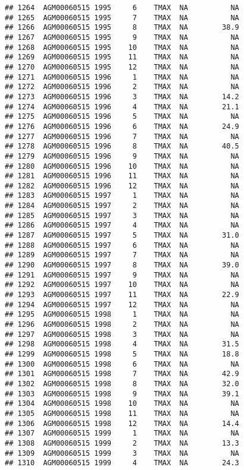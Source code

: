 \documentclass{article}\usepackage[]{graphicx}\usepackage[]{color}
\makeatletter
\newenvironment{kframe}{%
 \def\at@end@of@kframe{}%
 \ifinner\ifhmode%
  \def\at@end@of@kframe{\end{minipage}}%
  \begin{minipage}{\columnwidth}%
 \fi\fi%
 \def\FrameCommand##1{\hskip\@totalleftmargin \hskip-\fboxsep
 \colorbox{shadecolor}{##1}\hskip-\fboxsep
     \hskip-\linewidth \hskip-\@totalleftmargin \hskip\columnwidth}%
 \MakeFramed {\advance\hsize-\width
   \@totalleftmargin\z@ \linewidth\hsize
   \@setminipage}}%
 {\par\unskip\endMakeFramed%
 \at@end@of@kframe}
\newenvironment{knitrout}{}{} %
\makeatother
\begin{document}
\begin{knitrout}
\begin{kframe}
\begin{verbatim}
## 1264  AGM00060515 1995     6    TMAX  NA          NA
## 1265  AGM00060515 1995     7    TMAX  NA          NA
## 1266  AGM00060515 1995     8    TMAX  NA        38.9
## 1267  AGM00060515 1995     9    TMAX  NA          NA
## 1268  AGM00060515 1995    10    TMAX  NA          NA
## 1269  AGM00060515 1995    11    TMAX  NA          NA
## 1270  AGM00060515 1995    12    TMAX  NA          NA
## 1271  AGM00060515 1996     1    TMAX  NA          NA
## 1272  AGM00060515 1996     2    TMAX  NA          NA
## 1273  AGM00060515 1996     3    TMAX  NA        14.2
## 1274  AGM00060515 1996     4    TMAX  NA        21.1
## 1275  AGM00060515 1996     5    TMAX  NA          NA
## 1276  AGM00060515 1996     6    TMAX  NA        24.9
## 1277  AGM00060515 1996     7    TMAX  NA          NA
## 1278  AGM00060515 1996     8    TMAX  NA        40.5
## 1279  AGM00060515 1996     9    TMAX  NA          NA
## 1280  AGM00060515 1996    10    TMAX  NA          NA
## 1281  AGM00060515 1996    11    TMAX  NA          NA
## 1282  AGM00060515 1996    12    TMAX  NA          NA
## 1283  AGM00060515 1997     1    TMAX  NA          NA
## 1284  AGM00060515 1997     2    TMAX  NA          NA
## 1285  AGM00060515 1997     3    TMAX  NA          NA
## 1286  AGM00060515 1997     4    TMAX  NA          NA
## 1287  AGM00060515 1997     5    TMAX  NA        31.0
## 1288  AGM00060515 1997     6    TMAX  NA          NA
## 1289  AGM00060515 1997     7    TMAX  NA          NA
## 1290  AGM00060515 1997     8    TMAX  NA        39.0
## 1291  AGM00060515 1997     9    TMAX  NA          NA
## 1292  AGM00060515 1997    10    TMAX  NA          NA
## 1293  AGM00060515 1997    11    TMAX  NA        22.9
## 1294  AGM00060515 1997    12    TMAX  NA          NA
## 1295  AGM00060515 1998     1    TMAX  NA          NA
## 1296  AGM00060515 1998     2    TMAX  NA          NA
## 1297  AGM00060515 1998     3    TMAX  NA          NA
## 1298  AGM00060515 1998     4    TMAX  NA        31.5
## 1299  AGM00060515 1998     5    TMAX  NA        18.8
## 1300  AGM00060515 1998     6    TMAX  NA          NA
## 1301  AGM00060515 1998     7    TMAX  NA        42.9
## 1302  AGM00060515 1998     8    TMAX  NA        32.0
## 1303  AGM00060515 1998     9    TMAX  NA        39.1
## 1304  AGM00060515 1998    10    TMAX  NA          NA
## 1305  AGM00060515 1998    11    TMAX  NA          NA
## 1306  AGM00060515 1998    12    TMAX  NA        14.4
## 1307  AGM00060515 1999     1    TMAX  NA          NA
## 1308  AGM00060515 1999     2    TMAX  NA        13.3
## 1309  AGM00060515 1999     3    TMAX  NA          NA
## 1310  AGM00060515 1999     4    TMAX  NA        24.3

\end{verbatim}
\end{kframe}
\end{knitrout}
\end{document}
